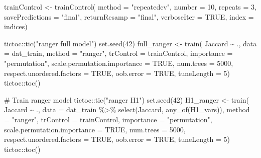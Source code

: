 \documentclass[
  letterpaper,
  DIV=11,
  numbers=noendperiod]{scrartcl}
\newenvironment{Shaded}{\begin{snugshade}}{\end{snugshade}}
\newcommand{\AttributeTok}[1]{\textcolor[rgb]{0.40,0.45,0.13}{#1}}
\newcommand{\CommentTok}[1]{\textcolor[rgb]{0.37,0.37,0.37}{#1}}
\newcommand{\ConstantTok}[1]{\textcolor[rgb]{0.56,0.35,0.01}{#1}}
\newcommand{\DecValTok}[1]{\textcolor[rgb]{0.68,0.00,0.00}{#1}}
\newcommand{\FunctionTok}[1]{\textcolor[rgb]{0.28,0.35,0.67}{#1}}
\newcommand{\NormalTok}[1]{\textcolor[rgb]{0.00,0.23,0.31}{#1}}
\newcommand{\OtherTok}[1]{\textcolor[rgb]{0.00,0.23,0.31}{#1}}
\newcommand{\SpecialCharTok}[1]{\textcolor[rgb]{0.37,0.37,0.37}{#1}}
\newcommand{\StringTok}[1]{\textcolor[rgb]{0.13,0.47,0.30}{#1}}
\begin{document}
\begin{Shaded}
\begin{Highlighting}[]
\NormalTok{trainControl }\OtherTok{\textless{}{-}} \FunctionTok{trainControl}\NormalTok{(}
    \AttributeTok{method =} \StringTok{"repeatedcv"}\NormalTok{,}
    \AttributeTok{number =} \DecValTok{10}\NormalTok{,}
    \AttributeTok{repeats =} \DecValTok{3}\NormalTok{,}
    \AttributeTok{savePredictions =} \StringTok{"final"}\NormalTok{,}
    \AttributeTok{returnResamp =} \StringTok{"final"}\NormalTok{,}
    \AttributeTok{verboseIter =} \ConstantTok{TRUE}\NormalTok{,}
    \AttributeTok{index =}\NormalTok{ indices)}

\NormalTok{tictoc}\SpecialCharTok{::}\FunctionTok{tic}\NormalTok{(}\StringTok{"ranger full model"}\NormalTok{)}
\FunctionTok{set.seed}\NormalTok{(}\DecValTok{42}\NormalTok{)}
\NormalTok{full\_ranger }\OtherTok{\textless{}{-}} \FunctionTok{train}\NormalTok{(}
\NormalTok{    Jaccard }\SpecialCharTok{\textasciitilde{}}\NormalTok{ .,}
    \AttributeTok{data =}\NormalTok{ dat\_train,}
    \AttributeTok{method =} \StringTok{"ranger"}\NormalTok{,}
    \AttributeTok{trControl =}\NormalTok{ trainControl,}
    \AttributeTok{importance =} \StringTok{"permutation"}\NormalTok{,}
    \AttributeTok{scale.permutation.importance =} \ConstantTok{TRUE}\NormalTok{,}
    \AttributeTok{num.trees =} \DecValTok{5000}\NormalTok{,}
    \AttributeTok{respect.unordered.factors =} \ConstantTok{TRUE}\NormalTok{,}
    \AttributeTok{oob.error =} \ConstantTok{TRUE}\NormalTok{,}
    \AttributeTok{tuneLength =} \DecValTok{5}\NormalTok{)}
\NormalTok{tictoc}\SpecialCharTok{::}\FunctionTok{toc}\NormalTok{()}


\CommentTok{\# Train ranger model}
\NormalTok{tictoc}\SpecialCharTok{::}\FunctionTok{tic}\NormalTok{(}\StringTok{"ranger H1"}\NormalTok{)}
\FunctionTok{set.seed}\NormalTok{(}\DecValTok{42}\NormalTok{)}
\NormalTok{H1\_ranger }\OtherTok{\textless{}{-}} \FunctionTok{train}\NormalTok{(}
\NormalTok{    Jaccard }\SpecialCharTok{\textasciitilde{}}\NormalTok{ .,}
    \AttributeTok{data =}\NormalTok{ dat\_train }\SpecialCharTok{\%\textgreater{}\%} \FunctionTok{select}\NormalTok{(Jaccard, }\FunctionTok{any\_of}\NormalTok{(H1\_vars)),}
    \AttributeTok{method =} \StringTok{"ranger"}\NormalTok{,}
    \AttributeTok{trControl =}\NormalTok{ trainControl,}
    \AttributeTok{importance =} \StringTok{"permutation"}\NormalTok{,}
    \AttributeTok{scale.permutation.importance =} \ConstantTok{TRUE}\NormalTok{,}
    \AttributeTok{num.trees =} \DecValTok{5000}\NormalTok{,}
    \AttributeTok{respect.unordered.factors =} \ConstantTok{TRUE}\NormalTok{,}
    \AttributeTok{oob.error =} \ConstantTok{TRUE}\NormalTok{,}
    \AttributeTok{tuneLength =} \DecValTok{5}\NormalTok{)}
\NormalTok{tictoc}\SpecialCharTok{::}\FunctionTok{toc}\NormalTok{()}



\end{Highlighting}
\end{Shaded}
\end{document}
